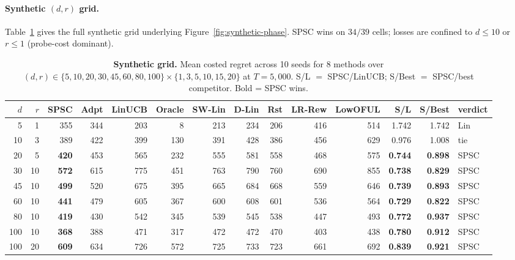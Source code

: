 \documentclass{article}
\begin{document}
\paragraph{Synthetic $(d,r)$ grid.}
Table~\ref{tab:app-synthetic} gives the full synthetic grid underlying
Figure~\ref{fig:synthetic-phase}. SPSC wins on $34/39$ cells; losses
are confined to $d\le 10$ or $r\le 1$ (probe-cost dominant).

\begin{table}[!htbp]
\centering
\caption{\textbf{Synthetic grid.} Mean costed regret across 10 seeds
for 8 methods over $(d,r)\in\{5,10,20,30,45,60,80,100\}\times\{1,3,5,10,15,20\}$
at $T{=}5{,}000$. S/L $=$ SPSC/LinUCB; S/Best $=$ SPSC/best competitor.
Bold = SPSC wins.}
\label{tab:app-synthetic}
\scriptsize
\setlength{\tabcolsep}{3pt}
\begin{tabular}{rr|rrrrrrrrr|rrl}
\toprule
$d$ & $r$ & SPSC & Adpt & LinUCB & Oracle & SW-Lin & D-Lin & Rst & LR-Rew & LowOFUL & S/L & S/Best & verdict\\
\midrule
  5 &  1 &   355 &   344 &   203 &     8 &   213 &   234 &   206 &   416 &   514 & 1.742 & 1.742 & Lin\\
 10 &  3 &   389 &   422 &   399 &   130 &   391 &   428 &   386 &   456 &   629 & 0.976 & 1.008 & tie\\
 20 &  5 &   \textbf{420} &   453 &   565 &   232 &   555 &   581 &   558 &   468 &   575 & \textbf{0.744} & \textbf{0.898} & SPSC\\
 30 & 10 &   \textbf{572} &   615 &   775 &   451 &   763 &   790 &   760 &   690 &   855 & \textbf{0.738} & \textbf{0.829} & SPSC\\
 45 & 10 &   \textbf{499} &   520 &   675 &   395 &   665 &   684 &   668 &   559 &   646 & \textbf{0.739} & \textbf{0.893} & SPSC\\
 60 & 10 &   \textbf{441} &   479 &   605 &   367 &   600 &   608 &   601 &   536 &   564 & \textbf{0.729} & \textbf{0.822} & SPSC\\
 80 & 10 &   \textbf{419} &   430 &   542 &   345 &   539 &   545 &   538 &   447 &   493 & \textbf{0.772} & \textbf{0.937} & SPSC\\
100 & 10 &   \textbf{368} &   388 &   471 &   317 &   472 &   472 &   470 &   403 &   438 & \textbf{0.780} & \textbf{0.912} & SPSC\\
100 & 20 &   \textbf{609} &   634 &   726 &   572 &   725 &   733 &   723 &   661 &   692 & \textbf{0.839} & \textbf{0.921} & SPSC\\
\bottomrule
\end{tabular}
\end{table}
\end{document}

